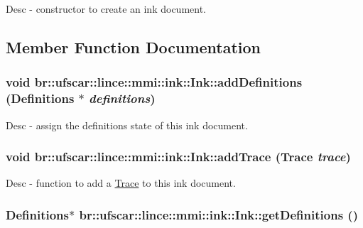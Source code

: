 Desc -\/ constructor to create an ink document. 



\subsection{Member Function Documentation}
\hypertarget{classbr_1_1ufscar_1_1lince_1_1mmi_1_1ink_1_1Ink_a020076b1bfae4c76a9fa42f87aa618a7}{
\subsubsection[{addDefinitions}]{\setlength{\rightskip}{0pt plus 5cm}void br::ufscar::lince::mmi::ink::Ink::addDefinitions (Definitions $\ast$ {\em definitions})}}
\label{classbr_1_1ufscar_1_1lince_1_1mmi_1_1ink_1_1Ink_a020076b1bfae4c76a9fa42f87aa618a7}


Desc -\/ assign the definitions state of this ink document. 

\hypertarget{classbr_1_1ufscar_1_1lince_1_1mmi_1_1ink_1_1Ink_a9fdefbe3184e360412b74675b853ad16}{
\subsubsection[{addTrace}]{\setlength{\rightskip}{0pt plus 5cm}void br::ufscar::lince::mmi::ink::Ink::addTrace ({\bf Trace} {\em trace})}}
\label{classbr_1_1ufscar_1_1lince_1_1mmi_1_1ink_1_1Ink_a9fdefbe3184e360412b74675b853ad16}


Desc -\/ function to add a \hyperlink{classbr_1_1ufscar_1_1lince_1_1mmi_1_1ink_1_1Trace}{Trace} to this ink document. 

\hypertarget{classbr_1_1ufscar_1_1lince_1_1mmi_1_1ink_1_1Ink_a1a6e44946dd40a11af964dabc129d11c}{
\subsubsection[{getDefinitions}]{\setlength{\rightskip}{0pt plus 5cm}Definitions$\ast$ br::ufscar::lince::mmi::ink::Ink::getDefinitions ()}}
\label{classbr_1_1ufscar_1_1lince_1_1mmi_1_1ink_1_1Ink_a1a6e44946dd40a11af964dabc129d11c}


